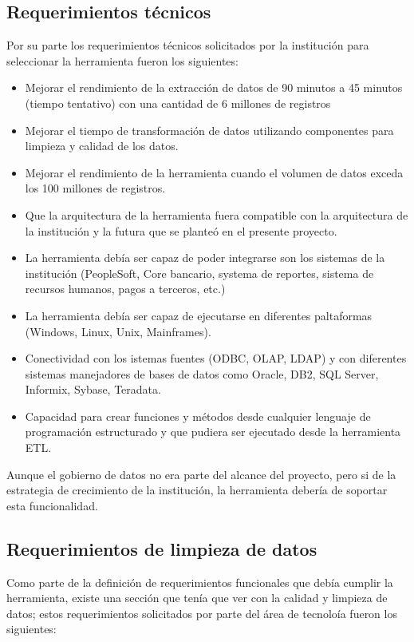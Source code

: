 \documentclass[a4paper,openright,12pt]{book}
\begin{document}
\subsection{Requerimientos técnicos}

Por su parte los requerimientos técnicos solicitados por la institución para seleccionar la herramienta fueron los siguientes:

\begin{itemize}
\item Mejorar el rendimiento de la extracción de datos de 90 minutos a 45 minutos (tiempo tentativo) con una cantidad de 6 millones de registros
\item Mejorar el tiempo de transformación de datos utilizando componentes para limpieza y calidad de los datos.
\item Mejorar el rendimiento de la herramienta cuando el volumen de datos exceda los 100 millones de registros.
\item Que la arquitectura de la herramienta fuera compatible con la arquitectura de la institución y la futura que se planteó en el presente proyecto.
\item La herramienta debía ser capaz de poder integrarse son los sistemas de la institución (PeopleSoft, Core bancario, systema de reportes, sistema de recursos humanos, pagos a terceros, etc.)
\item La herramienta debía ser capaz de ejecutarse en diferentes paltaformas (Windows, Linux, Unix, Mainframes).
\item Conectividad con los istemas fuentes (ODBC, OLAP, LDAP) y con diferentes sistemas manejadores de bases de datos como Oracle, DB2, SQL Server, Informix, Sybase, Teradata.
\item Capacidad para crear funciones y  métodos desde cualquier lenguaje de programación estructurado y que pudiera ser ejecutado desde la herramienta ETL.
\end{itemize}

Aunque el gobierno de datos no era parte del alcance del proyecto, pero si de la estrategia de crecimiento de la institución, la herramienta debería de soportar esta funcionalidad.

\subsection{Requerimientos de limpieza de datos}
Como parte de la definición de requerimientos funcionales que debía cumplir la herramienta, existe una sección que tenía que ver con la calidad y limpieza de datos; estos requerimientos solicitados por parte del área de tecnoloía fueron los siguientes: 
\end{document}
